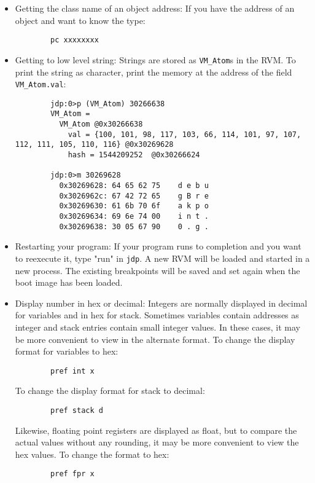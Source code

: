 \begin{itemize}
\item Getting the class name of an object address:
  If you have the address of an object and want to know the type:
\begin{verbatim}
        pc xxxxxxxx
\end{verbatim}


\item Getting to low level string:
  Strings are stored as {\tt VM\_Atom}s in the RVM.     
  To print the string as character, print the memory at the address of
  the field {\tt VM\_Atom.val}:

\begin{verbatim}
        jdp:0>p (VM_Atom) 30266638
        VM_Atom = 
          VM_Atom @0x30266638
            val = {100, 101, 98, 117, 103, 66, 114, 101, 97, 107, 112, 111, 105, 110, 116} @0x30269628
            hash = 1544209252  @0x30266624

        jdp:0>m 30269628
          0x30269628: 64 65 62 75    d e b u
          0x3026962c: 67 42 72 65    g B r e
          0x30269630: 61 6b 70 6f    a k p o
          0x30269634: 69 6e 74 00    i n t .
          0x30269638: 30 05 67 90    0 . g .
\end{verbatim}


\item Restarting your program:
  If your program runs to completion and you want to reexecute it,
  type "run" in {\tt jdp}.  A new RVM will be loaded and started in a new
  process.  The existing breakpoints will be saved and set again 
  when the boot image has been loaded.


\item Display number in hex or decimal:
  Integers are normally displayed in decimal for variables and
  in hex for stack.  Sometimes variables contain addresses as 
  integer and stack entries contain small integer values.    In
  these cases, it may be more convenient to view in the alternate
  format.
  To change the display format for variables to hex:
\begin{verbatim}
        pref int x
\end{verbatim}
  To change the display format for stack to decimal:
\begin{verbatim}
        pref stack d
\end{verbatim}
  Likewise, floating point registers are displayed as float, but
  to compare the actual values without any rounding, it may be more
  convenient to view the hex values.  To change the format to hex:
\begin{verbatim}
        pref fpr x
\end{verbatim}


\end{itemize}
